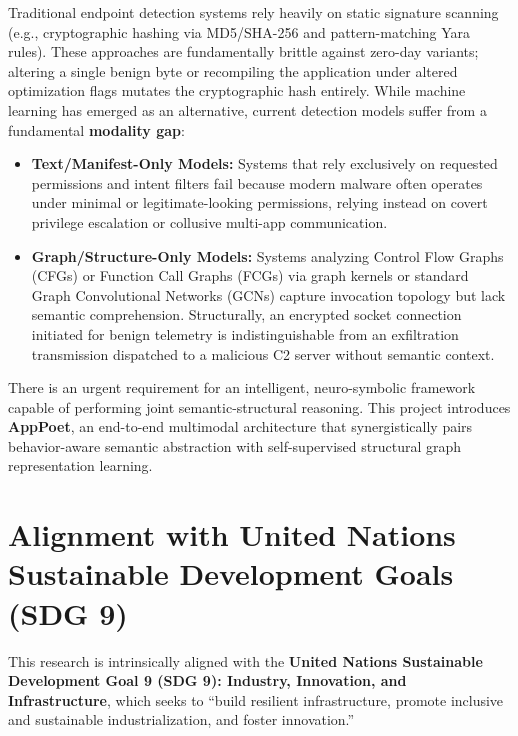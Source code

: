 \documentclass[12pt,a4paper,oneside]{report}
\begin{document}
Traditional endpoint detection systems rely heavily on static signature scanning (e.g., cryptographic hashing via MD5/SHA-256 and pattern-matching Yara rules). These approaches are fundamentally brittle against zero-day variants; altering a single benign byte or recompiling the application under altered optimization flags mutates the cryptographic hash entirely. While machine learning has emerged as an alternative, current detection models suffer from a fundamental \textbf{modality gap}:
\begin{itemize}
    \item \textbf{Text/Manifest-Only Models:} Systems that rely exclusively on requested permissions and intent filters fail because modern malware often operates under minimal or legitimate-looking permissions, relying instead on covert privilege escalation or collusive multi-app communication.
    \item \textbf{Graph/Structure-Only Models:} Systems analyzing Control Flow Graphs (CFGs) or Function Call Graphs (FCGs) via graph kernels or standard Graph Convolutional Networks (GCNs) capture invocation topology but lack semantic comprehension. Structurally, an encrypted socket connection initiated for benign telemetry is indistinguishable from an exfiltration transmission dispatched to a malicious C2 server without semantic context.
\end{itemize}

There is an urgent requirement for an intelligent, neuro-symbolic framework capable of performing joint semantic-structural reasoning. This project introduces \textbf{AppPoet}, an end-to-end multimodal architecture that synergistically pairs behavior-aware semantic abstraction with self-supervised structural graph representation learning.

\section{Alignment with United Nations Sustainable Development Goals (SDG 9)}
This research is intrinsically aligned with the \textbf{United Nations Sustainable Development Goal 9 (SDG 9): Industry, Innovation, and Infrastructure}, which seeks to ``build resilient infrastructure, promote inclusive and sustainable industrialization, and foster innovation.'' 
\end{document}
